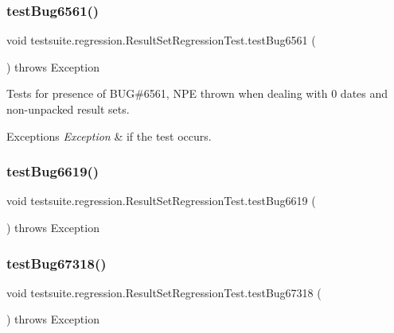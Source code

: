 \subsubsection{\texorpdfstring{test\+Bug6561()}{testBug6561()}}
{\footnotesize\ttfamily void testsuite.\+regression.\+Result\+Set\+Regression\+Test.\+test\+Bug6561 (\begin{DoxyParamCaption}{ }\end{DoxyParamCaption}) throws Exception}

Tests for presence of B\+UG\#6561, N\+PE thrown when dealing with 0 dates and non-\/unpacked result sets.


\begin{DoxyExceptions}{Exceptions}
{\em Exception} & if the test occurs. \\
\hline
\end{DoxyExceptions}
\mbox{\label{classtestsuite_1_1regression_1_1_result_set_regression_test_a53c45e064577ff74f71310ab3a226198}} 
\subsubsection{\texorpdfstring{test\+Bug6619()}{testBug6619()}}
{\footnotesize\ttfamily void testsuite.\+regression.\+Result\+Set\+Regression\+Test.\+test\+Bug6619 (\begin{DoxyParamCaption}{ }\end{DoxyParamCaption}) throws Exception}

\mbox{\label{classtestsuite_1_1regression_1_1_result_set_regression_test_a1ef1850491041aac8a3c98968d839a10}} 
\subsubsection{\texorpdfstring{test\+Bug67318()}{testBug67318()}}
{\footnotesize\ttfamily void testsuite.\+regression.\+Result\+Set\+Regression\+Test.\+test\+Bug67318 (\begin{DoxyParamCaption}{ }\end{DoxyParamCaption}) throws Exception}

